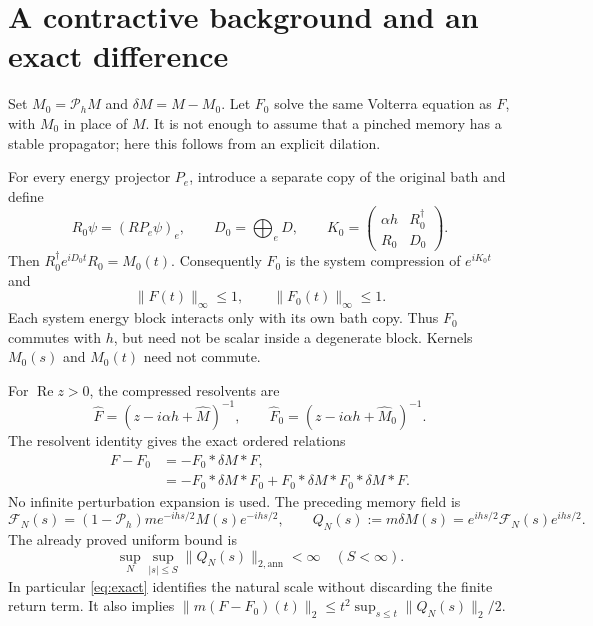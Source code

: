 \documentclass[11pt]{article}
\newcommand{\PP}{\mathcal P_h}
\newcommand{\FF}{\mathcal F}
\begin{document}
\newpage
\section{A contractive background and an exact difference}
Set $M_0=\PP M$ and $\delta M=M-M_0$. Let $F_0$ solve the same
Volterra equation as $F$, with $M_0$ in place of $M$.
It is not enough to assume that a pinched memory has a stable
propagator; here this follows from an explicit dilation.

For every energy projector $P_e$, introduce a separate copy of
the original bath and define
\begin{equation}
 R_0\psi=(RP_e\psi)_e,\qquad
 D_0=\bigoplus_e D,\qquad
 K_0=\begin{pmatrix}\alpha h&R_0^\dagger\\R_0&D_0\end{pmatrix}.
\end{equation}
Then $R_0^\dagger e^{iD_0t}R_0=M_0(t)$. Consequently $F_0$ is the
system compression of $e^{iK_0t}$ and
\begin{equation}
 \|F(t)\|_\infty\le1,\qquad \|F_0(t)\|_\infty\le1.
 \label{eq:contract}
\end{equation}
Each system energy block interacts only with its own bath copy.
Thus $F_0$ commutes with $h$, but need not be scalar inside a
degenerate block. Kernels $M_0(s)$ and $M_0(t)$ need not commute.

For $\operatorname{Re}z>0$, the compressed resolvents are
\begin{equation}
 \widehat F=(z-i\alpha h+\widehat M)^{-1},\qquad
 \widehat F_0=(z-i\alpha h+\widehat M_0)^{-1}.
\end{equation}
The resolvent identity gives the exact ordered relations
\begin{align}
 F-F_0&=-F_0*\delta M*F,\label{eq:exact}\\
 &=-F_0*\delta M*F_0+F_0*\delta M*F_0*\delta M*F.
\end{align}
No infinite perturbation expansion is used. The preceding memory
field is
\begin{equation}
 \FF_N(s)=(1-\PP)m e^{-ihs/2}M(s)e^{-ihs/2},\qquad
 Q_N(s):=m\delta M(s)=e^{ihs/2}\FF_N(s)e^{ihs/2}.
 \label{eq:Q}
\end{equation}
The already proved uniform bound is
\begin{equation}
 \sup_N\sup_{|s|\le S}\|Q_N(s)\|_{2,\mathrm{ann}}<\infty
 \quad(S<\infty).\label{eq:collective}
\end{equation}
In particular \eqref{eq:exact} identifies the natural scale without
discarding the finite return term. It also implies
$\|m(F-F_0)(t)\|_2\le t^2\sup_{s\le t}\|Q_N(s)\|_2/2$.
\end{document}

